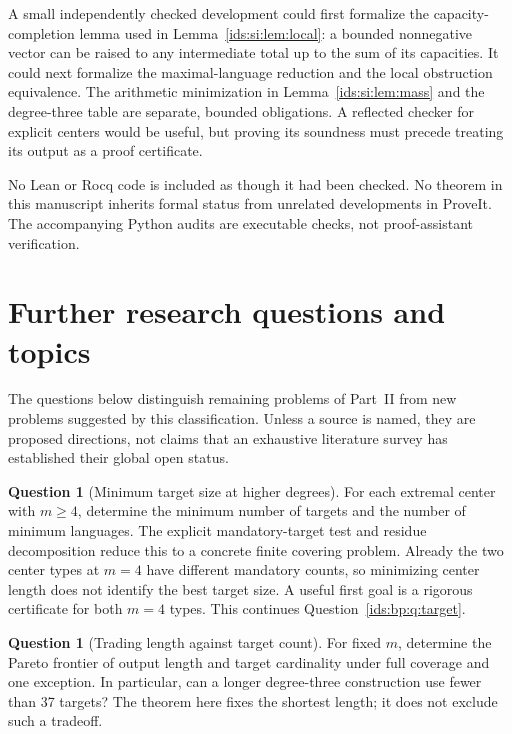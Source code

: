 \documentclass[11pt,letterpaper]{article}
\theoremstyle{definition}\newtheorem{definition}[theorem]{Definition}
\theoremstyle{remark}\newtheorem{remark}[theorem]{Remark}
\theoremstyle{definition}\newtheorem{question}[theorem]{Question}
\begin{document}
A small independently checked development could first formalize the
capacity-completion lemma used in Lemma~\ref{ids:si:lem:local}: a bounded nonnegative
vector can be raised to any intermediate total up to the sum of its
capacities. It could next formalize the maximal-language reduction and the
local obstruction equivalence. The arithmetic minimization in
Lemma~\ref{ids:si:lem:mass} and the degree-three table are separate, bounded obligations.
A reflected checker for explicit centers would be useful, but proving its
soundness must precede treating its output as a proof certificate.

No Lean or Rocq code is included as though it had been checked. No theorem
in this manuscript inherits formal status from unrelated developments in
ProveIt. The accompanying Python audits are executable checks, not
proof-assistant verification.

\section{Further research questions and topics}\label{ids:si:sec:questions}

The questions below distinguish remaining problems of Part~II from new
problems suggested by this classification. Unless a source is named, they
are proposed directions, not claims that an exhaustive literature survey
has established their global open status.

\begin{question}[Minimum target size at higher degrees]\label{ids:si:q:target}
For each extremal center with $m\geq4$, determine the minimum number of
targets and the number of minimum languages. The explicit mandatory-target
test and residue decomposition reduce this to a concrete finite covering
problem. Already the two center types at $m=4$ have different mandatory
counts, so minimizing center length does not identify the best target size.
A useful first goal is a rigorous certificate for both $m=4$ types.
This continues Question~\ref{ids:bp:q:target}.
\end{question}

\begin{question}[Trading length against target count]\label{ids:si:q:pareto}
For fixed $m$, determine the Pareto frontier of output length and target
cardinality under full coverage and one exception. In particular, can a
longer degree-three construction use fewer than 37 targets? The theorem
here fixes the shortest length; it does not exclude such a tradeoff.
\end{question}
\end{document}
